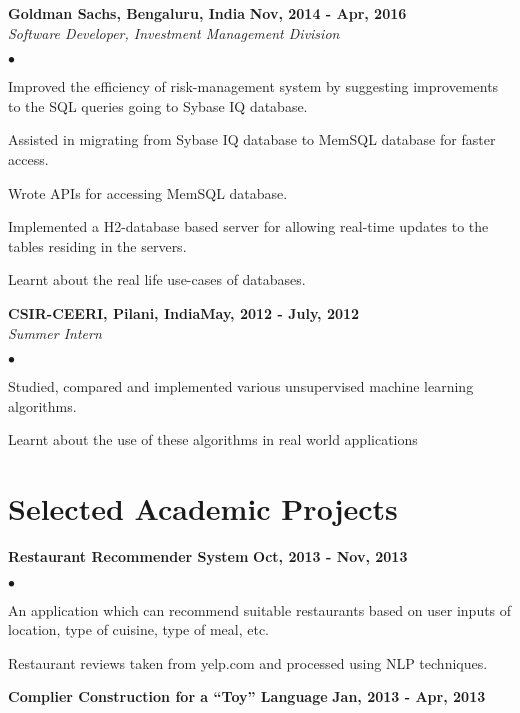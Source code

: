 \documentclass[margin,line]{res}
\newenvironment{list2}{
  \begin{list}{$\bullet$}{%
      \setlength{\itemsep}{0in}
      \setlength{\parsep}{0in} \setlength{\parskip}{0in}
      \setlength{\topsep}{0in} \setlength{\partopsep}{0in} 
      \setlength{\leftmargin}{0.2in}}}{\end{list}}
\begin{document}
\begin{resume}
{\bf Goldman Sachs, Bengaluru, India} \hfill {\bf Nov, 2014 - Apr, 2016}\\
{\em Software Developer, Investment Management Division}
\vspace{.3cm}
\begin{list2}
\item Improved the efficiency of risk-management system by suggesting improvements to the SQL
queries going to Sybase IQ database.
\item Assisted in migrating from Sybase IQ database to MemSQL database for faster access.
\item Wrote APIs for accessing MemSQL database.
\item Implemented a H2-database based server for allowing real-time updates to the tables residing in
the servers.
\item Learnt about the real life use-cases of databases.
\end{list2}

{\bf CSIR-CEERI, Pilani, India}\hfill {\bf May, 2012 - July, 2012}\\
{\em Summer Intern} 
\vspace{.3cm}
\begin{list2}
\item Studied, compared and implemented various unsupervised machine learning algorithms.
\item Learnt about the use of these algorithms in real world applications
\end{list2}

\section{\sc Selected Academic Projects}

{\bf Restaurant Recommender System} \hfill {\bf Oct, 2013 - Nov, 2013}\\

\vspace{-.3cm}
\begin{list2}
\item An application which can recommend suitable restaurants based on user inputs of location, type of
cuisine, type of meal, etc.
\item Restaurant reviews taken from yelp.com and processed using NLP techniques.
\end{list2}

{\bf Complier Construction for a “Toy” Language} \hfill {\bf Jan, 2013 - Apr, 2013}\\


\end{resume}
\end{document}
